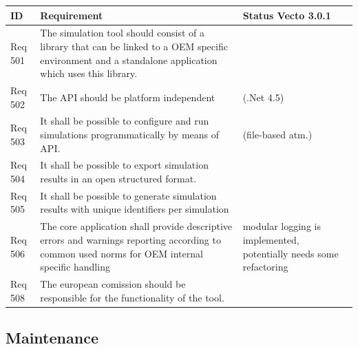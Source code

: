 \begin{tabular}{L{\IdColWidth}|L{\ReqColWidth}|M{\StatusColWidth}}
ID & Requirement & Status Vecto 3.0.1 \\ \hline\hline
Req 501 & The simulation tool should consist of a library that can be linked to a OEM specific environment and a standalone application which uses this library. & 
	\Vcheck	 \\ \hline
Req 502 & The API should be platform independent & 
	\Vcheck \newline (.Net 4.5)	 \\ \hline
Req 503 & It shall be possible to configure and run simulations programmatically by means of API. & 
	\Vcheck \newline (file-based atm.)	 \\ \hline
Req 504 & It shall be possible to export simulation results in an open structured format. & 
	\Vcheck	 \\ \hline
Req 505 & It shall be possible to generate simulation results with unique identifiers per simulation & 
	\Vtodo	 \\ \hline
Req 506 & The core application shall provide descriptive errors and warnings reporting according to common used norms for OEM internal specific handling & 
	modular logging is implemented, potentially needs some refactoring	 \\ \hline
Req 508 & The european comission should be responsible for the functionality of the tool. & 
		 \\ \hline
\end{tabular}

\subsection{Maintenance} %
\label{sub:maintenance}

